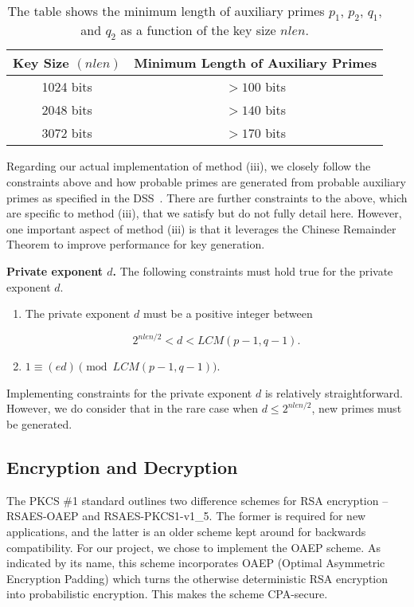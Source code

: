 \documentclass[letterpaper]{article}
\begin{document}
\begin{table}[h]
\centering
\begin{tabular}{|c|c|} 
 \hline
 Key Size $(nlen)$ & Minimum Length of Auxiliary Primes\\ \hline
 1024 bits & $> 100$ bits \\ 
 2048 bits & $> 140$ bits \\ 
 3072 bits & $> 170$ bits \\
 \hline
\end{tabular}
\caption{The table shows the minimum length of auxiliary primes $p_1$, $p_2$, $q_1$, and $q_2$ as a function of the key size $nlen$.}
\label{tab:aux_len}
\end{table}

Regarding our actual implementation of method (iii), we closely follow the constraints above and how probable primes are generated from probable auxiliary primes as specified in the DSS~\cite{fips2013186}. There are further constraints to the above, which are specific to method (iii), that we satisfy but do not fully detail here. However, one important aspect of method (iii) is that it leverages the Chinese Remainder Theorem to improve performance for key generation.\newline

\noindent \textbf{Private exponent $d$.} The following constraints must hold true for the private exponent $d$.

\begin{enumerate}
    \item The private exponent $d$ must be a positive integer between

        \begin{equation}
            2^{nlen/2} < d < LCM(p-1,q-1).
        \end{equation}

    \item $1 \equiv (ed) \pmod{LCM(p-1,q-1)}$.
\end{enumerate}

Implementing constraints for the private exponent $d$ is relatively straightforward. However, we do consider that in the rare case when $d \leq 2^{nlen/2}$, new primes must be generated.

\subsection{Encryption and Decryption}

The PKCS {\#1} standard outlines two difference schemes for RSA encryption – RSAES-OAEP and RSAES-PKCS1-v1\_5. The former is required for new applications, and the latter is an older scheme kept around for backwards compatibility. For our project, we chose to implement the OAEP scheme. As indicated by its name, this scheme incorporates OAEP (Optimal Asymmetric Encryption Padding) which turns the otherwise deterministic RSA encryption into probabilistic encryption. This makes the scheme CPA-secure.
\end{document}
